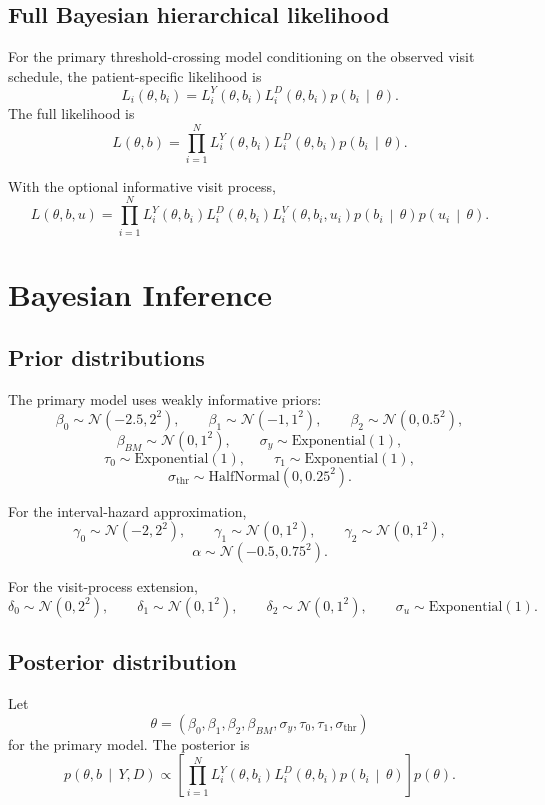 \documentclass[11pt]{article}
\theoremstyle{remark}
\newcommand{\Normal}{\mathcal{N}}
\newcommand{\given}{\,\middle|\,}
\begin{document}
\subsection{Full Bayesian hierarchical likelihood}

For the primary threshold-crossing model conditioning on the observed visit schedule, the patient-specific likelihood is
\[
L_i(\theta,b_i)
=
L_i^Y(\theta,b_i)
L_i^D(\theta,b_i)
p(b_i\given \theta).
\]
The full likelihood is
\[
L(\theta,b)
=
\prod_{i=1}^{N}
L_i^Y(\theta,b_i)
L_i^D(\theta,b_i)
p(b_i\given\theta).
\]

With the optional informative visit process,
\[
L(\theta,b,u)
=
\prod_{i=1}^{N}
L_i^Y(\theta,b_i)
L_i^D(\theta,b_i)
L_i^V(\theta,b_i,u_i)
p(b_i\given\theta)
p(u_i\given\theta).
\]

\section{Bayesian Inference}

\subsection{Prior distributions}

The primary model uses weakly informative priors:
\[
\beta_0\sim \Normal(-2.5,2^2),
\qquad
\beta_1\sim \Normal(-1,1^2),
\qquad
\beta_2\sim \Normal(0,0.5^2),
\]
\[
\beta_{BM}\sim \Normal(0,1^2),
\qquad
\sigma_y\sim \mathrm{Exponential}(1),
\]
\[
\tau_0\sim \mathrm{Exponential}(1),
\qquad
\tau_1\sim \mathrm{Exponential}(1),
\]
\[
\sigma_{\mathrm{thr}}\sim \mathrm{HalfNormal}(0,0.25^2).
\]

For the interval-hazard approximation,
\[
\gamma_0\sim \Normal(-2,2^2),
\qquad
\gamma_1\sim \Normal(0,1^2),
\qquad
\gamma_2\sim \Normal(0,1^2),
\]
\[
\alpha\sim \Normal(-0.5,0.75^2).
\]

For the visit-process extension,
\[
\delta_0\sim \Normal(0,2^2),
\qquad
\delta_1\sim \Normal(0,1^2),
\qquad
\delta_2\sim \Normal(0,1^2),
\qquad
\sigma_u\sim \mathrm{Exponential}(1).
\]

\subsection{Posterior distribution}

Let
\[
\theta
=
(\beta_0,\beta_1,\beta_2,\beta_{BM},
\sigma_y,\tau_0,\tau_1,\sigma_{\mathrm{thr}})
\]
for the primary model. The posterior is
\[
p(\theta,b\given Y,D)
\propto
\left[
\prod_{i=1}^{N}
L_i^Y(\theta,b_i)
L_i^D(\theta,b_i)
p(b_i\given\theta)
\right]
p(\theta).
\]
\end{document}
